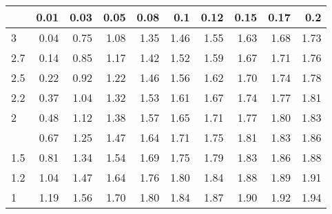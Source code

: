 
\begin{tabular}{lrrrrrrrrr}
\toprule
  & 0.01 & 0.03 & 0.05 & 0.08 & 0.1 & 0.12 & 0.15 & 0.17 & 0.2\\
\midrule
3 & 0.04 & 0.75 & 1.08 & 1.35 & 1.46 & 1.55 & 1.63 & 1.68 & 1.73\\
2.7 & 0.14 & 0.85 & 1.17 & 1.42 & 1.52 & 1.59 & 1.67 & 1.71 & 1.76\\
2.5 & 0.22 & 0.92 & 1.22 & 1.46 & 1.56 & 1.62 & 1.70 & 1.74 & 1.78\\
2.2 & 0.37 & 1.04 & 1.32 & 1.53 & 1.61 & 1.67 & 1.74 & 1.77 & 1.81\\
2 & 0.48 & 1.12 & 1.38 & 1.57 & 1.65 & 1.71 & 1.77 & 1.80 & 1.83\\
\addlinespace
1.7 & 0.67 & 1.25 & 1.47 & 1.64 & 1.71 & 1.75 & 1.81 & 1.83 & 1.86\\
1.5 & 0.81 & 1.34 & 1.54 & 1.69 & 1.75 & 1.79 & 1.83 & 1.86 & 1.88\\
1.2 & 1.04 & 1.47 & 1.64 & 1.76 & 1.80 & 1.84 & 1.88 & 1.89 & 1.91\\
1 & 1.19 & 1.56 & 1.70 & 1.80 & 1.84 & 1.87 & 1.90 & 1.92 & 1.94\\
\bottomrule
\end{tabular}
